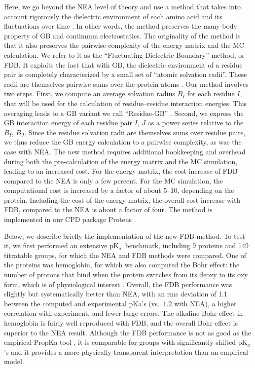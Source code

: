 \documentclass[a4paper,12pt]{article}
\newcommand{\pk}{pK$_a$}
\begin{document}
Here, we go beyond the NEA level of theory and use a method that takes into account rigorously the dielectric environment
of each amino acid and its fluctuations over time \cite{Archontis05b}. In other words, the method preserves the many-body
property of GB and continuum electrostatics. The originality of the method is that it also preserves the pairwise complexity
of the energy matrix and the MC calculation. We refer to it as the ``Fluctuating Dielectric Boundary'' method, or FDB.
It exploits the fact that with GB, the dielectric environment of a residue pair is completely characterized by a small
set of ``atomic solvation radii''. These radii are themselves pairwise sums over the protein atoms \cite{Hawkins95,
Schaefer96}. Our method involves two steps. First, we compute an average solvation radius $B_I$ for each residue $I$,
that will be used for the calculation of residue--residue interaction energies. This averaging leads to a GB variant
we call ``Residue-GB'' \cite{Archontis05b}. Second, we express the GB interaction energy of each residue pair $I$, $J$
as a power series relative to the $B_I$, $B_J$. Since the residue solvation radii are themselves sums over residue pairs,
we thus reduce the GB energy calculation to a pairwise complexity, as was the case with NEA. The new method requires
additional bookkeeping and overhead during both the pre-calculation of the energy matrix and the MC simulation, leading
to an increased cost. For the energy matrix, the cost increase of FDB compared to the NEA is only a few percent. For
the MC simulation, the computational cost is increased by a factor of about 5--10, depending on the protein. Including
the cost of the energy matrix, the overall cost increase with FDB, compared to the NEA is about a factor of four. The
method is implemented in our CPD package Proteus \cite{Schmidt08,Simonson13b,Polydorides16}.

Below, we describe briefly the implementation of the new FDB method. To test it, we first performed an extensive \pk\
benchmark, including 9 proteins and 149 titratable groups, for which the NEA and FDB methods were compared. One
of the proteins was hemoglobin, for which we also computed the Bohr effect: the number of protons that bind when the
protein switches from its deoxy to its oxy form, which is of physiological interest \cite{PerutzBK,Zheng13}. Overall,
the FDB performance was slightly but systematically better than NEA, with an rms deviation of 1.1 between the computed
and experimental pKa’s (vs.\ 1.2 with NEA), a higher correlation with experiment, and fewer large errors. The alkaline
Bohr effect in hemoglobin is fairly well reproduced with FDB, and the overall Bohr effect is superior to the NEA result.
Although the FDB performance is not as good as the empirical PropKa tool \cite{Olsson11}, it is comparable for groups
with significantly shifted \pk’s and it provides a more physically-transparent interpretation than an empirical model.
\end{document}
